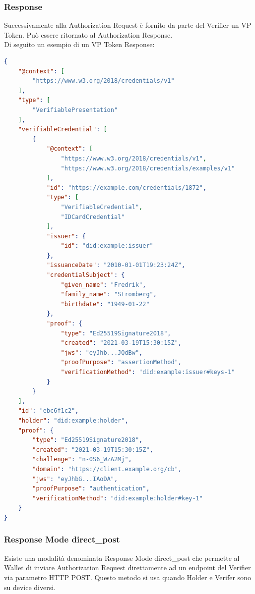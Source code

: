 \subsubsection{Response}
Successivamente alla Authorization Request è fornito da parte del Verifier un VP Token.
Può essere ritornato al Authorization Response.
\\Di seguito un esempio di un VP Token Response:
\begin{lstlisting}[language=json,firstnumber=1]
{
    "@context": [
        "https://www.w3.org/2018/credentials/v1"
    ],
    "type": [
        "VerifiablePresentation"
    ],
    "verifiableCredential": [
        {
            "@context": [
                "https://www.w3.org/2018/credentials/v1",
                "https://www.w3.org/2018/credentials/examples/v1"
            ],
            "id": "https://example.com/credentials/1872",
            "type": [
                "VerifiableCredential",
                "IDCardCredential"
            ],
            "issuer": {
                "id": "did:example:issuer"
            },
            "issuanceDate": "2010-01-01T19:23:24Z",
            "credentialSubject": {
                "given_name": "Fredrik",
                "family_name": "Stromberg",
                "birthdate": "1949-01-22"
            },
            "proof": {
                "type": "Ed25519Signature2018",
                "created": "2021-03-19T15:30:15Z",
                "jws": "eyJhb...JQdBw",
                "proofPurpose": "assertionMethod",
                "verificationMethod": "did:example:issuer#keys-1"
            }
        }
    ],
    "id": "ebc6f1c2",
    "holder": "did:example:holder",
    "proof": {
        "type": "Ed25519Signature2018",
        "created": "2021-03-19T15:30:15Z",
        "challenge": "n-0S6_WzA2Mj",
        "domain": "https://client.example.org/cb",
        "jws": "eyJhbG...IAoDA",
        "proofPurpose": "authentication",
        "verificationMethod": "did:example:holder#key-1"
    }
}
\end{lstlisting}

\subsubsection{Response Mode direct\_post}
Esiste una modalità denominata Response Mode direct\_post che permette al Wallet di inviare Authorization Request 
direttamente ad un endpoint del Verifier via parametro HTTP POST. Questo metodo si usa quando Holder e Verifer sono su device diversi.


